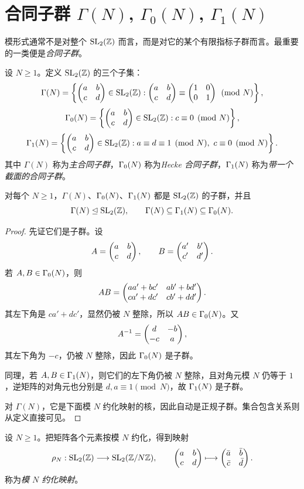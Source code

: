 \section{合同子群 $\Gamma(N)$, $\Gamma_0(N)$, $\Gamma_1(N)$}

模形式通常不是对整个 $\mathrm{SL}_2(\mathbb{Z})$ 而言，而是对它的某个有限指标子群而言。最重要的一类便是\emph{合同子群}。

\begin{definition}
设 $N\ge 1$。定义 $\mathrm{SL}_2(\mathbb{Z})$ 的三个子集：
\[
\Gamma(N)=\left\{\begin{pmatrix} a&b\\ c&d \end{pmatrix}\in \mathrm{SL}_2(\mathbb{Z}):
\begin{pmatrix} a&b\\ c&d \end{pmatrix}\equiv \begin{pmatrix} 1&0\\ 0&1 \end{pmatrix}\pmod N\right\},
\]
\[
\Gamma_0(N)=\left\{\begin{pmatrix} a&b\\ c&d \end{pmatrix}\in \mathrm{SL}_2(\mathbb{Z}):c\equiv 0\pmod N\right\},
\]
\[
\Gamma_1(N)=\left\{\begin{pmatrix} a&b\\ c&d \end{pmatrix}\in \mathrm{SL}_2(\mathbb{Z}):a\equiv d\equiv 1\pmod N,\ c\equiv 0\pmod N\right\}.
\]
其中 $\Gamma(N)$ 称为\emph{主合同子群}，$\Gamma_0(N)$ 称为\emph{Hecke 合同子群}，$\Gamma_1(N)$ 称为\emph{带一个截面的合同子群}。
\end{definition}

\begin{proposition}
对每个 $N\ge 1$，$\Gamma(N)$、$\Gamma_0(N)$、$\Gamma_1(N)$ 都是 $\mathrm{SL}_2(\mathbb{Z})$ 的子群，并且
\[
\Gamma(N)\trianglelefteq \mathrm{SL}_2(\mathbb{Z}),
\qquad
\Gamma(N)\subseteq \Gamma_1(N)\subseteq \Gamma_0(N).
\]
\end{proposition}

\begin{proof}
先证它们是子群。设
\[
A=\begin{pmatrix} a&b\\ c&d \end{pmatrix},\qquad B=\begin{pmatrix} a'&b'\\ c'&d' \end{pmatrix}.
\]
若 $A,B\in \Gamma_0(N)$，则
\[
AB=\begin{pmatrix} aa'+bc'&ab'+bd'\\ ca'+dc'&cb'+dd' \end{pmatrix}.
\]
其左下角是 $ca'+dc'$，显然仍被 $N$ 整除，所以 $AB\in \Gamma_0(N)$。又
\[
A^{-1}=\begin{pmatrix} d&-b\\ -c&a \end{pmatrix},
\]
其左下角为 $-c$，仍被 $N$ 整除，因此 $\Gamma_0(N)$ 是子群。

同理，若 $A,B\in \Gamma_1(N)$，则它们的左下角仍被 $N$ 整除，且对角元模 $N$ 仍等于 $1$，逆矩阵的对角元也分别是 $d,a\equiv 1\pmod N$，故 $\Gamma_1(N)$ 是子群。

对 $\Gamma(N)$，它是下面模 $N$ 约化映射的核，因此自动是正规子群。集合包含关系则从定义直接可见。
\end{proof}

\begin{definition}
设 $N\ge 1$。把矩阵各个元素按模 $N$ 约化，得到映射
\[
\rho_N:\mathrm{SL}_2(\mathbb{Z})\longrightarrow \mathrm{SL}_2(\mathbb{Z}/N\mathbb{Z}),
\qquad
\begin{pmatrix} a&b\\ c&d \end{pmatrix}\longmapsto \begin{pmatrix} \bar a&\bar b\\ \bar c&\bar d \end{pmatrix}.
\]
称为\emph{模 $N$ 约化映射}。
\end{definition}


